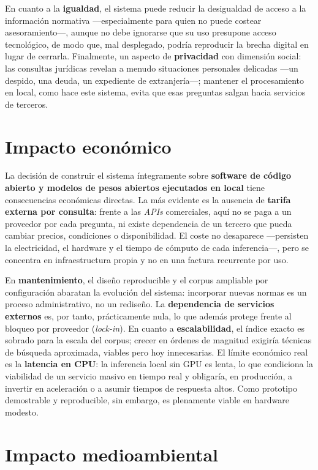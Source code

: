 En cuanto a la \textbf{igualdad}, el sistema puede reducir la desigualdad de acceso a la información normativa —especialmente para quien no puede costear asesoramiento—, aunque no debe ignorarse que su uso presupone acceso tecnológico, de modo que, mal desplegado, podría reproducir la brecha digital en lugar de cerrarla. Finalmente, un aspecto de \textbf{privacidad} con dimensión social: las consultas jurídicas revelan a menudo situaciones personales delicadas —un despido, una deuda, un expediente de extranjería—; mantener el procesamiento en local, como hace este sistema, evita que esas preguntas salgan hacia servicios de terceros.

\section{Impacto económico}
\label{sec:impacto-economico}

La decisión de construir el sistema íntegramente sobre \textbf{software de código abierto y modelos de pesos abiertos ejecutados en local} \cite{touvron2023llama2} tiene consecuencias económicas directas. La más evidente es la ausencia de \textbf{tarifa externa por consulta}: frente a las \emph{APIs} comerciales, aquí no se paga a un proveedor por cada pregunta, ni existe dependencia de un tercero que pueda cambiar precios, condiciones o disponibilidad. El coste no desaparece —persisten la electricidad, el hardware y el tiempo de cómputo de cada inferencia—, pero se concentra en infraestructura propia y no en una factura recurrente por uso.

En \textbf{mantenimiento}, el diseño reproducible y el corpus ampliable por configuración abaratan la evolución del sistema: incorporar nuevas normas es un proceso administrativo, no un rediseño. La \textbf{dependencia de servicios externos} es, por tanto, prácticamente nula, lo que además protege frente al bloqueo por proveedor (\emph{lock-in}). En cuanto a \textbf{escalabilidad}, el índice exacto es sobrado para la escala del corpus; crecer en órdenes de magnitud exigiría técnicas de búsqueda aproximada, viables pero hoy innecesarias. El límite económico real es la \textbf{latencia en CPU}: la inferencia local sin GPU es lenta, lo que condiciona la viabilidad de un servicio masivo en tiempo real y obligaría, en producción, a invertir en aceleración o a asumir tiempos de respuesta altos. Como prototipo demostrable y reproducible, sin embargo, es plenamente viable en hardware modesto.

\section{Impacto medioambiental}
\label{sec:impacto-medioambiental}

